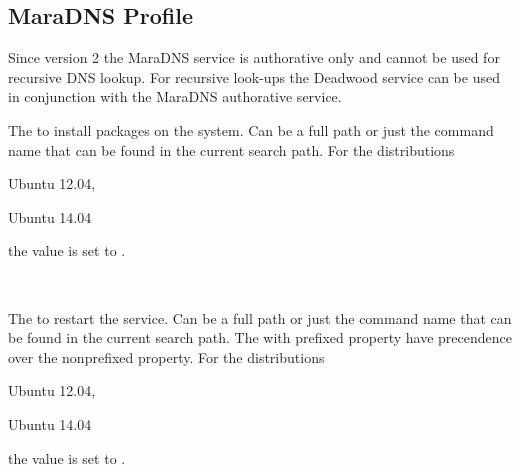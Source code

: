 \label{sec:maradns_profile}
\subsection{MaraDNS Profile}

Since version 2 the MaraDNS service is authorative only and cannot be used for 
recursive DNS lookup. For recursive look-ups the Deadwood service can be used 
in conjunction with the MaraDNS authorative service.


The  to install packages on the system. Can be a full path or
just the command name that can be found in the current search path. 
For the distributions
\begin{inparaitem}
\item[\TheDistribution{ubuntu}] Ubuntu 12.04,
\item[\TheDistribution{ubuntu}] Ubuntu 14.04
\end{inparaitem}
the value is set to .

\\

The  to restart the service. Can be a full path or
just the command name that can be found in the current search path. 
The with  prefixed property have precendence over the 
nonprefixed property.
For the distributions
\begin{inparaitem}
\item[\TheDistribution{ubuntu}] Ubuntu 12.04,
\item[\TheDistribution{ubuntu}] Ubuntu 14.04
\end{inparaitem}
the value is set to .

\\

